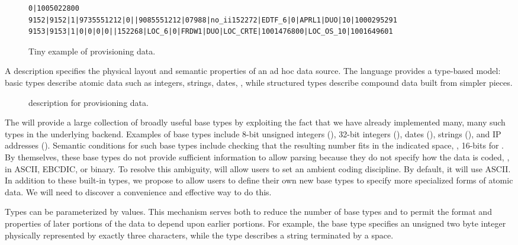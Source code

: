 \documentclass[11pt]{article}
\begin{document}
\begin{figure*}
\begin{small}
\begin{verbatim}
0|1005022800
9152|9152|1|9735551212|0||9085551212|07988|no_ii152272|EDTF_6|0|APRL1|DUO|10|1000295291
9153|9153|1|0|0|0|0||152268|LOC_6|0|FRDW1|DUO|LOC_CRTE|1001476800|LOC_OS_10|1001649601
\end{verbatim}
\caption{Tiny example of \dibbler{} provisioning data.}
\label{figure:dibbler-records}
\end{small}
\end{figure*}

A \datatype{} description specifies the physical layout and 
semantic properties of an ad hoc data source. 
The language provides a type-based model:
basic types describe atomic data such as integers, strings, dates, \etc{}, while
structured types describe compound data built from simpler pieces.
\suppressfloats


\begin{figure}
\begin {code}

\end{code}
\caption{\datatype{} description for \dibbler{} provisioning data.}
\label{figure:dibblerml}
\end{figure}

The \datatype{} will provide a large collection of broadly useful base
types by exploiting the fact that we have already implemented many,
many such types in the underlying \pads{} backend.  Examples of base
types include 8-bit unsigned integers (), 32-bit
integers (), dates (), strings (),
and IP addresses ().  Semantic conditions for such base types
include checking that the resulting number fits in the indicated
space, \ie, 16-bits for .  By themselves, these base types
do not provide sufficient information to allow parsing because they do
not specify how the data is coded, \ie{}, in ASCII, EBCDIC, or binary.
To resolve this ambiguity, \datatype{} will allow users to set an
ambient coding discipline.  By default, it will use ASCII.  In addition to
these built-in types, we propose to allow users to define their own new base 
types to specify more specialized forms of atomic data.  We
will need to discover a convenience and effective way to do this.

Types can be parameterized by values.  This mechanism serves
both to reduce the number of base types and to permit the format and
properties of later portions of the data to depend upon earlier
portions.  For example, the base type  specifies
an unsigned two byte integer physically represented by exactly three
characters, while the type  describes a string
terminated by a space.
\end{document}
